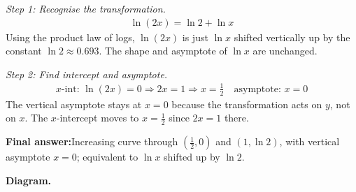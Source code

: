 \documentclass[11pt]{article}
\begin{document}
\textit{Step 1: Recognise the transformation.}
\[\begin{gathered}
\ln(2x) = \ln 2 + \ln x
\end{gathered}\]
Using the product law of logs, \( \ln(2x) \) is just \( \ln x \) shifted vertically up by the constant \( \ln 2 \approx 0.693 \). The shape and asymptote of \( \ln x \) are unchanged.

\textit{Step 2: Find intercept and asymptote.}
\[\begin{gathered}
x\text{-int: } \ln(2x) = 0 \Rightarrow 2x = 1 \Rightarrow x = \tfrac{1}{2} \quad \text{asymptote: } x = 0
\end{gathered}\]
The vertical asymptote stays at \( x = 0 \) because the transformation acts on \( y \), not on \( x \). The \( x \)-intercept moves to \( x = \tfrac{1}{2} \) since \( 2x = 1 \) there.

\begin{answerbox}
\textbf{Final answer:}\quad Increasing curve through \(\displaystyle (\tfrac{1}{2}, 0)\) and \(\displaystyle (1, \ln 2)\), with vertical asymptote \(\displaystyle  x = 0 \); equivalent to \(\displaystyle  \ln x \) shifted up by \(\displaystyle  \ln 2 \).
\end{answerbox}
\textbf{Diagram.}
\end{document}
